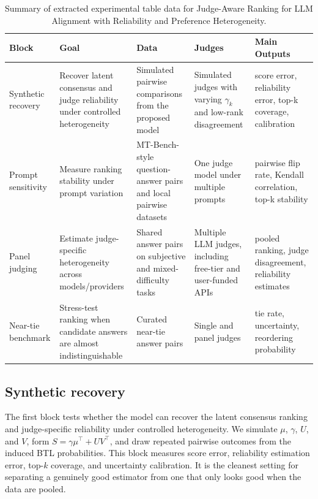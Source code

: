 \documentclass{article}
\begin{document}
\begin{bibunit}[unsrtnat]
{\renewcommand{\arraystretch}{1.05}
\begin{table}[t]
\centering
\caption{Summary of extracted experimental table data for Judge-Aware Ranking for LLM Alignment with Reliability and Preference Heterogeneity.}
\label{tab:starter-results}\tiny
\begin{tabularx}{\textwidth}{lPPPP}
\toprule
Block & Goal & Data & Judges & Main Outputs \\
\midrule
Synthetic recovery & Recover latent consensus and judge reliability under controlled heterogeneity & Simulated pairwise comparisons from the proposed model & Simulated judges with varying $\gamma_k$ and low-rank disagreement & score error, reliability error, top-k coverage, calibration \\
Prompt sensitivity & Measure ranking stability under prompt variation & MT-Bench-style question-answer pairs and local pairwise datasets & One judge model under multiple prompts & pairwise flip rate, Kendall correlation, top-k stability \\
Panel judging & Estimate judge-specific heterogeneity across models/providers & Shared answer pairs on subjective and mixed-difficulty tasks & Multiple LLM judges, including free-tier and user-funded APIs & pooled ranking, judge disagreement, reliability estimates \\
Near-tie benchmark & Stress-test ranking when candidate answers are almost indistinguishable & Curated near-tie answer pairs & Single and panel judges & tie rate, uncertainty, reordering probability \\
\bottomrule
\end{tabularx}
\end{table}

}

\subsection{Synthetic recovery}

The first block tests whether the model can recover the latent consensus ranking and judge-specific reliability under controlled heterogeneity. We simulate $\mu$, $\gamma$, $U$, and $V$, form $S = \gamma \mu^\top + UV^\top$, and draw repeated pairwise outcomes from the induced BTL probabilities. This block measures score error, reliability estimation error, top-$k$ coverage, and uncertainty calibration. It is the cleanest setting for separating a genuinely good estimator from one that only looks good when the data are pooled.


\end{bibunit}
\end{document}
